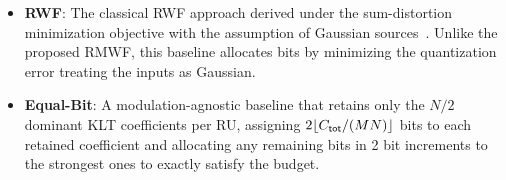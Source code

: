 \documentclass[10pt, twocolumn, comsoc]{IEEEtran}
\begin{document}
\begin{itemize}
    \item \textbf{RWF}:
    The classical RWF approach derived under the sum-distortion minimization objective with the assumption of Gaussian sources~\cite{CoverThomas}. Unlike the proposed RMWF, this baseline allocates bits by minimizing the quantization error treating the inputs as Gaussian.
    

    \item \textbf{Equal-Bit}:
    A modulation-agnostic baseline that retains only the $N/2$ dominant KLT coefficients per RU, assigning $2 \lfloor C_{\sf{tot}} / (MN) \rfloor$ bits to each retained coefficient and allocating any remaining bits in 2 bit increments to the strongest ones to exactly satisfy the budget.
\end{itemize}

\end{document}
